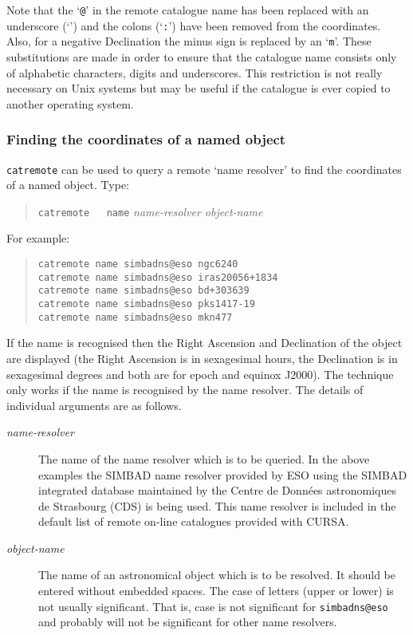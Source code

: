 \documentclass[twoside,11pt]{article}
\newcommand{\htmladdnormallink}[2]{#1}
\renewcommand{\_}{\texttt{\symbol{95}}}
\begin{document}
Note that the `{\tt @}' in the remote catalogue name has been replaced
with an underscore (`{\tt \_}') and the colons (`{\tt :}') have been
removed from the coordinates.  Also, for a negative Declination the
minus sign is replaced by an `{\tt m}'.  These substitutions are made
in order to ensure that the catalogue name consists only of alphabetic
characters, digits and underscores.  This restriction is not really
necessary on Unix systems but may be useful if the catalogue is ever
copied to another operating system.

\subsubsection{Finding the coordinates of a named object}

{\tt catremote} can be used to query a remote `name resolver' to find
the coordinates of a named object.  Type:

\begin{verse}
{\tt catremote ~ name} {\it name-resolver object-name}
\end{verse}

For example:

\begin{verse}
{\tt catremote name simbad\_ns@eso ngc6240   \\
catremote name simbad\_ns@eso iras20056+1834 \\
catremote name simbad\_ns@eso bd+303639 \\
catremote name simbad\_ns@eso pks1417-19 \\
catremote name simbad\_ns@eso mkn477}
\end{verse}

If the name is recognised then the Right Ascension and Declination of the
object are displayed (the Right Ascension is in sexagesimal hours, the
Declination is in sexagesimal degrees and both are for epoch and equinox
J2000).  The technique only works if the name is recognised by the name
resolver.  The details of individual arguments are as follows.

\begin{description}

  \item[{\it name-resolver}\/] The name of the name resolver which is to
   be queried.  In the above examples the SIMBAD name resolver provided by
   ESO using the SIMBAD integrated database maintained by the 
   \htmladdnormallink{Centre de Donn\'{e}es astronomiques de Strasbourg}
   {http://cdsweb.u-strasbg.fr/CDS.html} (CDS) is being used.  This name
   resolver is included in the default list of remote on-line catalogues
   provided with CURSA.

  \item[{\it object-name}] The name of an astronomical object which is to
   be resolved.  It should be entered without embedded spaces.  The case of
   letters (upper or lower) is not usually significant.  That is, case is
   not significant for {\tt simbad\_ns@eso} and probably will not be
   significant for other name resolvers.

\end{description}
\end{document}
